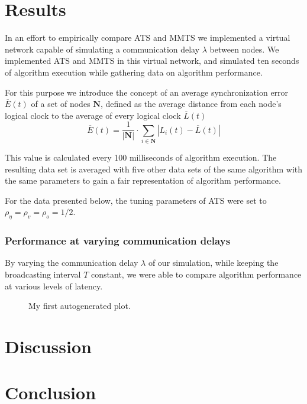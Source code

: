 \documentclass[a4paper,12pt]{article}
\begin{document}
\section{Results}

In an effort to empirically compare ATS and MMTS we implemented a virtual network capable of simulating a communication delay $\lambda$ between nodes. We implemented ATS and MMTS in this virtual network, and simulated ten seconds of algorithm execution while gathering data on algorithm performance.

For this purpose we introduce the concept of an average synchronization error $\overline{E}(t)$ of a set of nodes $\boldsymbol{N}$, defined as the average distance from each node's logical clock to the average of every logical clock $\overline{L}(t)$ $$\overline{E}(t) = \frac{1}{|\boldsymbol{N}|} \cdot \sum_{i \in \boldsymbol{N}} \left| L_i(t) - \overline{L}(t) \right|$$

This value is calculated every 100 milliseconds of algorithm execution. The resulting data set is averaged with five other data sets of the same algorithm with the same parameters to gain a fair representation of algorithm performance.

For the data presented below, the tuning parameters of ATS were set to $\rho_\eta = \rho_v = \rho_o = 1 / 2$.

\subsubsection{Performance at varying communication delays}
By varying the communication delay $\lambda$ of our simulation, while keeping the broadcasting interval $T$ constant, we were able to compare algorithm performance at various levels of latency.

\begin{figure}[h!]
  \begin{center}
    \caption{My first autogenerated plot.}
  \end{center}
\end{figure}


\section{Discussion}

\section{Conclusion}


\end{document}

